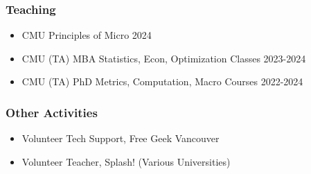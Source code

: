\documentclass[12pt]{article}   %
\begin{document}

\subsubsection*{Teaching}
\begin{itemize}
  \item CMU \hspace{9.2 em} Principles of Micro \hfill 2024
  \item CMU (TA) \hspace{7 em} MBA Statistics, Econ, Optimization Classes \hfill 2023-2024
  \item CMU (TA) \hspace{7 em} PhD Metrics, Computation, Macro Courses \hfill 2022-2024
\end{itemize}




\subsubsection*{Other Activities}
\begin{itemize}
  \item Volunteer Tech Support, Free Geek Vancouver 
  
  \item Volunteer Teacher, Splash! (Various Universities)
  
\end{itemize}
\end{document}
